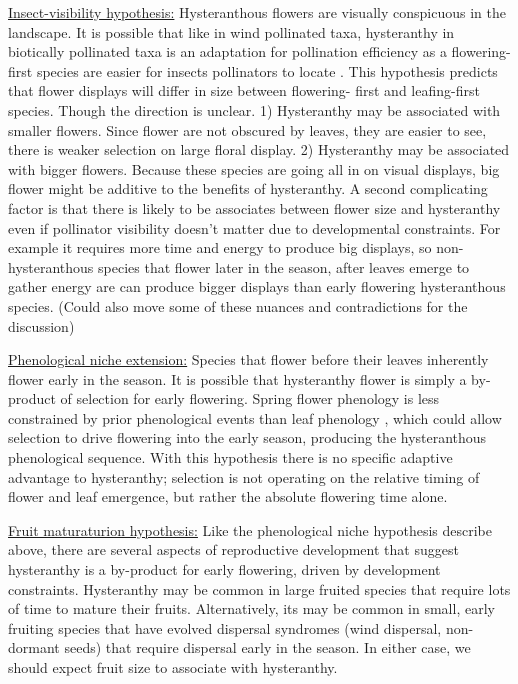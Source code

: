 \documentclass{article}[11pt]
\begin{document}
\underline{Insect-visibility hypothesis:} Hysteranthous flowers are visually conspicuous in the landscape. It is possible that like in wind pollinated taxa, hysteranthy in biotically pollinated taxa is an adaptation for pollination efficiency as a flowering-first species are easier for insects pollinators to locate \citep{Janzen1967}. This hypothesis predicts that flower displays will differ in size between flowering- first and leafing-first species. Though the direction is unclear. 1) Hysteranthy may be associated with smaller flowers. Since flower are not obscured by leaves, they are easier to see, there is weaker selection on large floral display. 2) Hysteranthy may be associated with bigger flowers. Because these species are going all in on visual displays, big flower might be additive to the benefits of hysteranthy. A second complicating factor is that there is likely to be associates between flower size and hysteranthy even if pollinator visibility doesn't matter due to developmental constraints. For example it requires more time and energy to produce big displays, so non-hysteranthous species that flower later in the season, after leaves emerge to gather energy are can produce bigger displays than early flowering hysteranthous species. (Could also move some of these nuances and contradictions for the discussion)

\underline{Phenological niche extension:} Species that flower before their leaves inherently flower early in the season. It is possible that hysteranthy flower is simply a by-product of selection for early flowering.
 Spring flower phenology is less constrained by prior phenological events than leaf phenology \citep{Savage2019}, which could allow selection to drive flowering into the early season, producing the hysteranthous phenological sequence. With this hypothesis there is no specific adaptive advantage to hysteranthy;  selection is not operating on the relative timing of flower and leaf emergence, but rather the absolute flowering time alone.

\underline{Fruit maturaturion hypothesis:} Like the phenological niche hypothesis describe above, there are several aspects of reproductive development that suggest hysteranthy is a by-product for early flowering, driven by development constraints. Hysteranthy may be common in large fruited species that require lots of time to mature their fruits. Alternatively, its may be common in small, early fruiting species that have evolved dispersal syndromes (wind dispersal, non-dormant seeds) that require dispersal early in the season. In either case, we  should expect fruit size to associate with hysteranthy.
\end{document}
